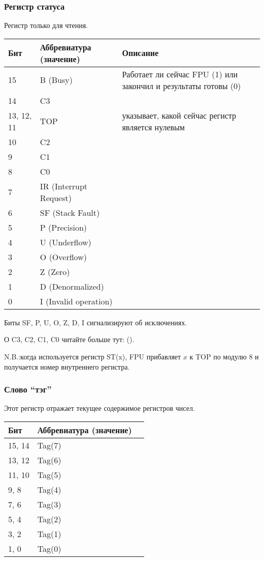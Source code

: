 \subsubsection{Регистр статуса}

\label{FPU_status_word}
Регистр только для чтения.

\small
\begin{center}
\begin{tabular}{ | l | l | l | }
\hline
Бит &
Аббревиатура (значение) &
Описание \\
\hline
15   & B (Busy) & Работает ли сейчас FPU (1)
или закончил и результаты готовы (0) \\
\hline
14   & C3 & \\
\hline
13, 12, 11 & TOP & указывает, какой сейчас регистр является нулевым \\
\hline
10 & C2 & \\
\hline
9  & C1 & \\
\hline
8  & C0 & \\
\hline
7  & IR (Interrupt Request) & \\
\hline
6  & SF (Stack Fault) & \\
\hline
5  & P (Precision) & \\
\hline
4  & U (Underflow) & \\
\hline
3  & O (Overflow) & \\
\hline
2  & Z (Zero) & \\
\hline
1  & D (Denormalized) & \\
\hline
0  & I (Invalid operation) & \\
\hline
\end{tabular}
\end{center}
\normalsize

Биты SF, P, U, O, Z, D, I сигнализируют об исключениях.

О C3, C2, C1, C0 читайте больше тут: ().

N.B.:когда используется регистр ST(x), FPU прибавляет $x$ к TOP по модулю 8 и получается номер
внутреннего регистра.

\subsubsection{Слово ``тэг''}

Этот регистр отражает текущее содержимое регистров чисел.

\begin{center}
\begin{tabular}{ | l | l | l | }
\hline
Бит & Аббревиатура (значение) \\
\hline
15, 14 & Tag(7) \\
\hline
13, 12 & Tag(6) \\
\hline
11, 10 & Tag(5) \\
\hline
9, 8 & Tag(4) \\
\hline
7, 6 & Tag(3) \\
\hline
5, 4 & Tag(2) \\
\hline
3, 2 & Tag(1) \\
\hline
1, 0 & Tag(0) \\
\hline
\end{tabular}
\end{center}

